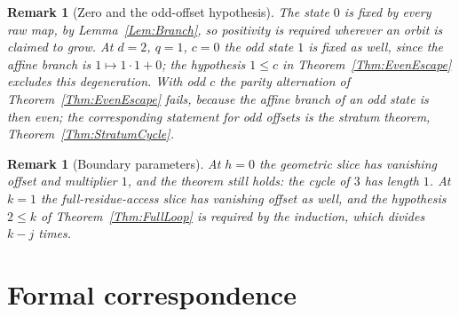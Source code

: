 \documentclass[11pt,letterpaper]{article}
\newtheorem{remark}[theorem]{Remark}
\begin{document}
\begin{remark}[Zero and the odd-offset hypothesis]\label{Rem:Zero}
The state \(0\) is fixed by every raw map, by Lemma~\ref{Lem:Branch}, so
positivity is required wherever an orbit is claimed to grow. At \(d=2\),
\(q=1\), \(c=0\) the odd state \(1\) is fixed as well, since the affine branch
is \(1\mapsto1\cdot1+0\); the hypothesis \(1\le c\) in
Theorem~\ref{Thm:EvenEscape} excludes this degeneration. With odd \(c\) the
parity alternation of Theorem~\ref{Thm:EvenEscape} fails, because the affine
branch of an odd state is then even; the corresponding statement for odd
offsets is the stratum theorem, Theorem~\ref{Thm:StratumCycle}.
\end{remark}

\begin{remark}[Boundary parameters]\label{Rem:Boundary}
At \(h=0\) the geometric slice has vanishing offset and multiplier \(1\), and
the theorem still holds: the cycle of \(3\) has length \(1\). At \(k=1\) the
full-residue-access slice has vanishing offset as well, and the hypothesis
\(2\le k\) of Theorem~\ref{Thm:FullLoop} is required by the induction, which
divides \(k-j\) times.
\end{remark}

\section{Formal correspondence}
\end{document}
